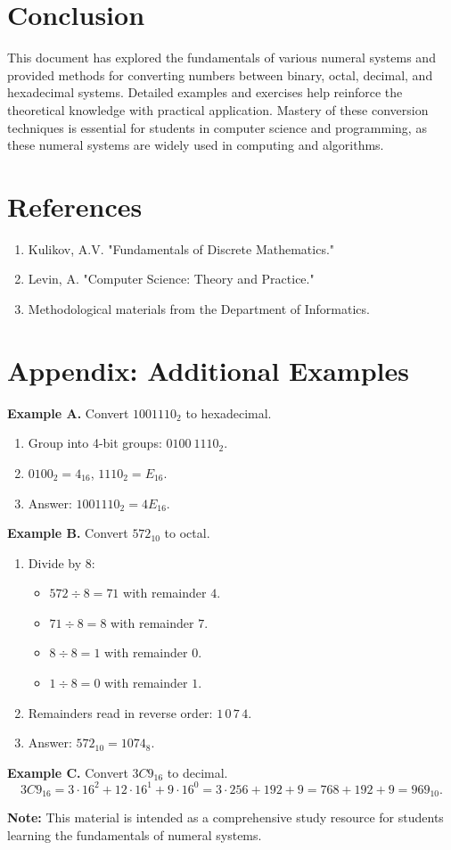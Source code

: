 \documentclass[12pt,a4paper]{article}
\begin{document}
\section{Conclusion}
This document has explored the fundamentals of various numeral systems and provided methods for converting numbers between binary, octal, decimal, and hexadecimal systems. Detailed examples and exercises help reinforce the theoretical knowledge with practical application. Mastery of these conversion techniques is essential for students in computer science and programming, as these numeral systems are widely used in computing and algorithms.

\section*{References}
\begin{enumerate}
    \item Kulikov, A.V. "Fundamentals of Discrete Mathematics."
    \item Levin, A. "Computer Science: Theory and Practice."
    \item Methodological materials from the Department of Informatics.
\end{enumerate}

\section*{Appendix: Additional Examples}

\textbf{Example A.} Convert \(1001110_2\) to hexadecimal.
\begin{enumerate}
    \item Group into 4-bit groups: \(0100\ 1110_2\).
    \item \(0100_2 = 4_{16}\), \(1110_2 = E_{16}\).
    \item Answer: \(1001110_2 = 4E_{16}\).
\end{enumerate}

\textbf{Example B.} Convert \(572_{10}\) to octal.
\begin{enumerate}
    \item Divide by 8:
    \begin{itemize}
        \item \(572 \div 8 = 71\) with remainder \(4\).
        \item \(71 \div 8 = 8\) with remainder \(7\).
        \item \(8 \div 8 = 1\) with remainder \(0\).
        \item \(1 \div 8 = 0\) with remainder \(1\).
    \end{itemize}
    \item Remainders read in reverse order: \(1\,0\,7\,4\).
    \item Answer: \(572_{10} = 1074_8\).
\end{enumerate}

\textbf{Example C.} Convert \(3C9_{16}\) to decimal.
\[
3C9_{16} = 3\cdot16^2 + 12\cdot16^1 + 9\cdot16^0 = 3\cdot256 + 192 + 9 = 768 + 192 + 9 = 969_{10}.
\]

\vfill
\textbf{Note:} This material is intended as a comprehensive study resource for students learning the fundamentals of numeral systems.
\end{document}
